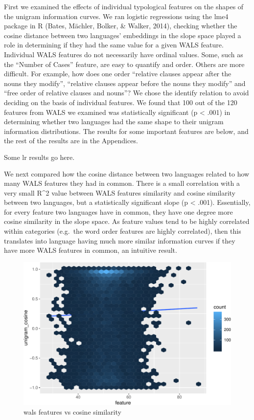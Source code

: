 \documentclass[11pt,]{article}
\begin{document}
First we examined the effects of individual typological features on the shapes of the unigram information curves. We ran logistic regressions using the lme4 package in R (Bates, Mächler, Bolker, \& Walker, 2014), checking whether the cosine distance between two languages' embeddings in the slope space played a role in determining if they had the same value for a given WALS feature. Individual WALS features do not necessarily have ordinal values. Some, such as the ``Number of Cases'' feature, are easy to quantify and order. Others are more difficult. For example, how does one order ``relative clauses appear after the nouns they modify'', ``relative clauses appear before the nouns they modify'' and ``free order of relative clauses and nouns''? We chose the identify relation to avoid deciding on the basis of individual features. We found that 100 out of the 120 features from WALS we examined was statistically significant (p \textless{} .001) in determining whether two languages had the same shape to their unigram information distributions. The results for some important features are below, and the rest of the results are in the Appendices.

Some lr results go here.

We next compared how the cosine distance between two languages related to how many WALS features they had in common. There is a small correlation with a very small R\^{}2 value between WALS features similarity and cosine similarity between two languages, but a statistically significant slope (p \textless{} .001). Essentially, for every feature two languages have in common, they have one degree more cosine similarity in the slope space. As feature values tend to be highly correlated within categories (e.g.~the word order features are highly correlated), then this translates into language having much more similar information curves if they have more WALS features in common, an intuitive result.

\begin{figure}
\centering
\includegraphics{paper_files/figure-latex/unnamed-chunk-9-1.pdf}
\caption{\label{fig:unnamed-chunk-9}wals features vs cosine similarity}
\end{figure}
\end{document}
